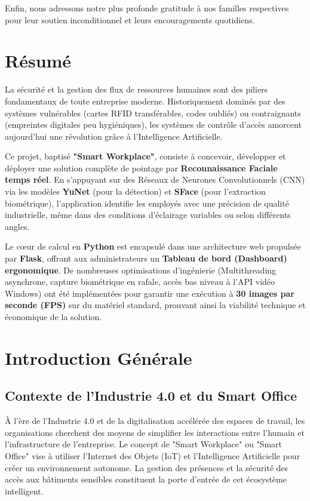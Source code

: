 \documentclass[12pt,a4paper]{report}
\begin{document}
Enfin, nous adressons notre plus profonde gratitude à nos familles respectives pour leur soutien inconditionnel et leurs encouragements quotidiens.

\vspace{2cm}

\chapter*{Résumé}
La sécurité et la gestion des flux de ressources humaines sont des piliers fondamentaux de toute entreprise moderne. Historiquement dominés par des systèmes vulnérables (cartes RFID transférables, codes oubliés) ou contraignants (empreintes digitales peu hygiéniques), les systèmes de contrôle d'accès amorcent aujourd'hui une révolution grâce à l'Intelligence Artificielle. 

Ce projet, baptisé \textbf{"Smart Workplace"}, consiste à concevoir, développer et déployer une solution complète de pointage par \textbf{Reconnaissance Faciale temps réel}. En s'appuyant sur des Réseaux de Neurones Convolutionnels (CNN) via les modèles \textbf{YuNet} (pour la détection) et \textbf{SFace} (pour l'extraction biométrique), l'application identifie les employés avec une précision de qualité industrielle, même dans des conditions d'éclairage variables ou selon différents angles.

Le cœur de calcul en \textbf{Python} est encapsulé dans une architecture web propulsée par \textbf{Flask}, offrant aux administrateurs un \textbf{Tableau de bord (Dashboard) ergonomique}. De nombreuses optimisations d'ingénierie (Multithreading asynchrone, capture biométrique en rafale, accès bas niveau à l'API vidéo Windows) ont été implémentées pour garantir une exécution à \textbf{30 images par seconde (FPS)} sur du matériel standard, prouvant ainsi la viabilité technique et économique de la solution.

\tableofcontents
\newpage
\listoffigures
\newpage

\chapter{Introduction Générale}
\section{Contexte de l'Industrie 4.0 et du Smart Office}
À l'ère de l'Industrie 4.0 et de la digitalisation accélérée des espaces de travail, les organisations cherchent des moyens de simplifier les interactions entre l'humain et l'infrastructure de l'entreprise. Le concept de "Smart Workplace" ou "Smart Office" vise à utiliser l'Internet des Objets (IoT) et l'Intelligence Artificielle pour créer un environnement autonome. La gestion des présences et la sécurité des accès aux bâtiments sensibles constituent la porte d'entrée de cet écosystème intelligent.
\end{document}
